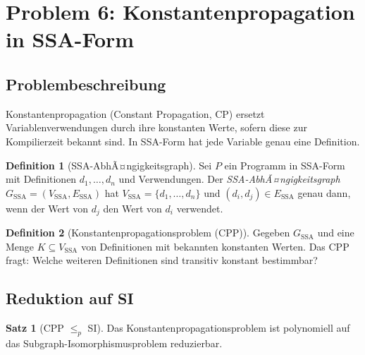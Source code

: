﻿\documentclass[a4paper,12pt]{article}
\theoremstyle{definition}
\newtheorem{definition}{Definition}
\newtheorem{satz}{Satz}
\begin{document}
\section{Problem 6: Konstantenpropagation in SSA-Form}
\label{sec:const}

\subsection{Problembeschreibung}

Konstantenpropagation (Constant Propagation, CP) ersetzt Variablenverwendungen durch ihre konstanten Werte, sofern diese zur Kompilierzeit bekannt sind. In SSA-Form hat jede Variable genau eine Definition.

\begin{definition}[SSA-AbhÃ¤ngigkeitsgraph]
\label{def:ssa}
Sei $P$ ein Programm in SSA-Form mit Definitionen $d_1, \ldots, d_n$ und Verwendungen. Der \emph{SSA-AbhÃ¤ngigkeitsgraph} $G_{\text{SSA}} = (V_{\text{SSA}}, E_{\text{SSA}})$ hat $V_{\text{SSA}} = \{d_1, \ldots, d_n\}$ und $(d_i, d_j) \in E_{\text{SSA}}$ genau dann, wenn der Wert von $d_j$ den Wert von $d_i$ verwendet.
\end{definition}

\begin{definition}[Konstantenpropagationsproblem (CPP)]
\label{def:cpp}
Gegeben $G_{\text{SSA}}$ und eine Menge $K \subseteq V_{\text{SSA}}$ von Definitionen mit bekannten konstanten Werten. Das CPP fragt: Welche weiteren Definitionen sind transitiv konstant bestimmbar?
\end{definition}

\subsection{Reduktion auf SI}

\begin{satz}[CPP $\leq_p$ SI]
\label{satz:cpp-si}
Das Konstantenpropagationsproblem ist polynomiell auf das Subgraph-Isomorphismusproblem reduzierbar.
\end{satz}
\end{document}
